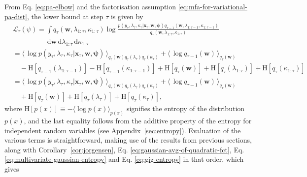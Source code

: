 From Eq. \eqref{eq:pa-elbow} and the factorisation assumption \eqref{eq:mfa-for-variational-pa-dist}, the lower bound at step $\tau$ is given by
\begin{align}
\label{eq:variational-objective-derivation}
	& \mathcal{L}_{\tau}(\psi)
	= \int q_{\tau}(\mathbf{w}, \lambda_{1:\tau}, \kappa_{1:\tau})
	\log\frac{p(y_\tau, \lambda_\tau, \kappa_\tau|\mathbf{x}_\tau, \mathbf{w}, \boldsymbol{\psi})q_{\tau-1}(\mathbf{w}, \lambda_{1:\tau-1}, \kappa_{1:\tau-1})}{q_{\tau}(\mathbf{w}, \lambda_{1:\tau}, \kappa_{1:\tau})}
	\nonumber \\
	& \qquad\qquad\quad \mathrm{d}\mathbf{w}\,\mathrm{d}\lambda_{1:\tau}\,\mathrm{d}\kappa_{1:\tau}
	\nonumber \\
	&= \langle\,\log p(y_\tau, \lambda_\tau, \kappa_\tau|\mathbf{x}_\tau, \mathbf{w}, \boldsymbol{\psi})\,\rangle_{q_{\tau}(\mathbf{w})q_{\tau}(\lambda_{\tau})q_{\tau}(\kappa_{\tau})}
	+ \langle\,\log q_{\tau-1}(\mathbf{w})\,\rangle_{q_{\tau}(\mathbf{w})}
	\nonumber \\
	& \quad - \mathrm{H}[q_{\tau-1}(\lambda_{1:\tau-1})]
	- \mathrm{H}[q_{\tau-1}(\kappa_{1:\tau-1})]
	+ \mathrm{H}[q_{\tau}(\mathbf{w})]
	+ \mathrm{H}[q_{\tau}(\lambda_{1:\tau})]
	+ \mathrm{H}[q_{\tau}(\kappa_{1:\tau})]
	\nonumber \\
	&= \langle\,\log p(y_\tau, \lambda_\tau, \kappa_\tau|\mathbf{x}_\tau, \mathbf{w}, \boldsymbol{\psi})\,\rangle_{q_{\tau}(\mathbf{w})q_{\tau}(\lambda_{\tau})q_{\tau}(\kappa_{\tau})}
	+ \langle\,\log q_{\tau-1}(\mathbf{w})\,\rangle_{q_{\tau}(\mathbf{w})}
	\nonumber \\
	& \quad + \mathrm{H}[q_{\tau}(\mathbf{w})]
	+ \mathrm{H}[q_{\tau}(\lambda_\tau)]
	+ \mathrm{H}[q_{\tau}(\kappa_\tau)],
\end{align}
where $\mathrm{H}[p(x)] \equiv -\langle\log p(x)\rangle_{p(x)}$ signifies the entropy of the distribution $p(x)$, and the last equality follows from the additive property of the entropy for independent random variables (see Appendix~\ref{sec:entropy}).
Evaluation of the various terms is straightforward, making use of the results from previous sections, along with Corollary~\ref{cor:jorgensen}, Eq. \eqref{eq:gaussian-avg-of-quadratic-fct}, Eq. \eqref{eq:multivariate-gaussian-entropy} and Eq. \eqref{eq:gig-entropy} in that order, which gives
